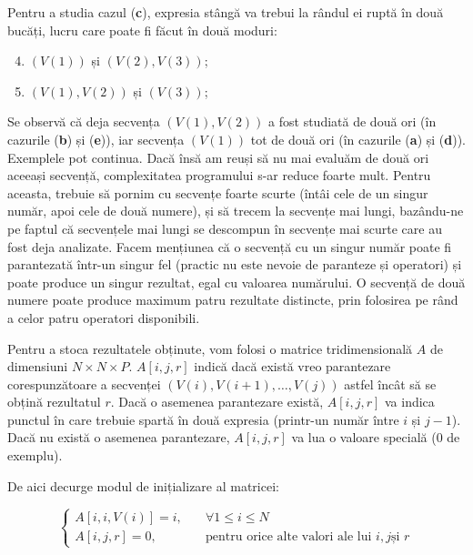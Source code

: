 Pentru a studia cazul ({\bf c}), expresia stângă va trebui la rândul ei ruptă
în două bucăți, lucru care poate fi făcut în două moduri:

\begin{enumerate}[label=(\alph*)]
  \setcounter{enumi}{3}

\item $(V(1))$ și $(V(2), V(3))$;

\item $(V(1), V(2))$ și $(V(3))$;

\end{enumerate}

Se observă că deja secvența $(V(1), V(2))$ a fost studiată de două ori (în
cazurile ({\bf b}) și ({\bf e})), iar secvența $(V(1))$ tot de două ori (în
cazurile ({\bf a}) și ({\bf d})). Exemplele pot continua. Dacă însă am reuși
să nu mai evaluăm de două ori aceeași secvență, complexitatea programului s-ar
reduce foarte mult. Pentru aceasta, trebuie să pornim cu secvențe foarte
scurte (întâi cele de un singur număr, apoi cele de două numere), și să trecem
la secvențe mai lungi, bazându-ne pe faptul că secvențele mai lungi se
descompun în secvențe mai scurte care au fost deja analizate. Facem mențiunea
că o secvență cu un singur număr poate fi parantezată într-un singur fel
(practic nu este nevoie de paranteze și operatori) și poate produce un singur
rezultat, egal cu valoarea numărului. O secvență de două numere poate produce
maximum patru rezultate distincte, prin folosirea pe rând a celor patru
operatori disponibili.

Pentru a stoca rezultatele obținute, vom folosi o matrice tridimensională $A$
de dimensiuni $N \times N \times P$. $A[i,j,r]$ indică dacă există vreo
parantezare corespunzătoare a secvenței $(V(i), V(i+1), \dots, V(j))$ astfel
încât să se obțină rezultatul $r$. Dacă o asemenea parantezare există,
$A[i,j,r]$ va indica punctul în care trebuie spartă în două expresia
(printr-un număr între $i$ și $j-1$). Dacă nu există o asemenea parantezare,
$A[i,j,r]$ va lua o valoare specială (0 de exemplu).

De aici decurge modul de inițializare al matricei:

\begin{equation}
  \begin{cases}
    A[i,i,V(i)] = i, & \quad \forall 1 \leq i \leq N \\

    A[i,j,r] = 0, & \quad \text{pentru orice alte valori ale lui } i, j \text{
      și } r
  \end{cases}
\end{equation}

